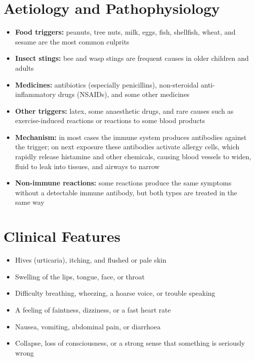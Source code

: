 \section*{Aetiology and Pathophysiology}
\begin{itemize}
    \item \textbf{Food triggers:} peanuts, tree nuts, milk, eggs, fish, shellfish, wheat, and sesame are the most common culprits
    \item \textbf{Insect stings:} bee and wasp stings are frequent causes in older children and adults
    \item \textbf{Medicines:} antibiotics (especially penicillins), non-steroidal anti-inflammatory drugs (NSAIDs), and some other medicines
    \item \textbf{Other triggers:} latex, some anaesthetic drugs, and rare causes such as exercise-induced reactions or reactions to some blood products
    \item \textbf{Mechanism:} in most cases the immune system produces antibodies against the trigger; on next exposure these antibodies activate allergy cells, which rapidly release histamine and other chemicals, causing blood vessels to widen, fluid to leak into tissues, and airways to narrow
    \item \textbf{Non-immune reactions:} some reactions produce the same symptoms without a detectable immune antibody, but both types are treated in the same way
\end{itemize}

\section*{Clinical Features}
\begin{itemize}
    \item Hives (urticaria), itching, and flushed or pale skin
    \item Swelling of the lips, tongue, face, or throat
    \item Difficulty breathing, wheezing, a hoarse voice, or trouble speaking
    \item A feeling of faintness, dizziness, or a fast heart rate
    \item Nausea, vomiting, abdominal pain, or diarrhoea
    \item Collapse, loss of consciousness, or a strong sense that something is seriously wrong
\end{itemize}

